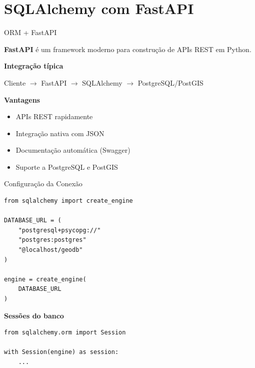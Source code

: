 \documentclass{beamer}
\begin{document}
\section{SQLAlchemy com FastAPI}
\begin{frame}{ORM + FastAPI}

\textbf{FastAPI} é um framework moderno para construção de APIs REST em Python.

\vspace{0.4cm}

\textbf{Integração típica}

\begin{center}
Cliente
$\rightarrow$
FastAPI
$\rightarrow$
SQLAlchemy
$\rightarrow$
PostgreSQL/PostGIS
\end{center}

\vspace{0.4cm}

\textbf{Vantagens}

\begin{itemize}
    \item APIs REST rapidamente
    \item Integração nativa com JSON
    \item Documentação automática (Swagger)
    \item Suporte a PostgreSQL e PostGIS
\end{itemize}

\end{frame}

\begin{frame}[fragile]{Configuração da Conexão}

\begin{verbatim}
from sqlalchemy import create_engine

DATABASE_URL = (
    "postgresql+psycopg://"
    "postgres:postgres"
    "@localhost/geodb"
)

engine = create_engine(
    DATABASE_URL
)
\end{verbatim}

\vspace{0.4cm}

\textbf{Sessões do banco}

\begin{verbatim}
from sqlalchemy.orm import Session

with Session(engine) as session:
    ...
\end{verbatim}

\end{frame}
\end{document}
